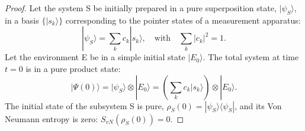 \documentclass[11pt, letterpaper]{report}
\theoremstyle{plain} %
\theoremstyle{definition} %
\theoremstyle{remark} %
\begin{document}
\begin{proof}
Let the system S be initially prepared in a pure superposition state, $|\psi_S\rangle$, in a basis $\{|s_k\rangle\}$ corresponding to the pointer states of a measurement apparatus:
\begin{equation}
    |\psi_S\rangle = \sum_k c_k |s_k\rangle, \quad \text{with} \quad \sum_k |c_k|^2 = 1.
\end{equation}
Let the environment E be in a simple initial state $|E_0\rangle$. The total system at time $t=0$ is in a pure product state:
\begin{equation}
    |\Psi(0)\rangle = |\psi_S\rangle \otimes |E_0\rangle = \left(\sum_k c_k |s_k\rangle\right) \otimes |E_0\rangle.
\end{equation}
The initial state of the subsystem S is pure, $\rho_S(0) = |\psi_S\rangle\langle\psi_S|$, and its Von Neumann entropy is zero: $S_{vN}(\rho_S(0)) = 0$.


\end{proof}
\end{document}
